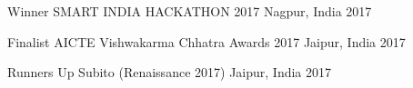 \begin{cvhonors}
  \cvhonor
    {Winner}
    {SMART INDIA HACKATHON 2017}
    {Nagpur, India}
    {2017}
 
  \cvhonor
    {Finalist}
    {AICTE Vishwakarma Chhatra Awards 2017}
    {Jaipur, India}
    {2017}
    
  \cvhonor
    {Runners Up}
    {Subito (Renaissance 2017)}
    {Jaipur, India}
    {2017}
 
\end{cvhonors}